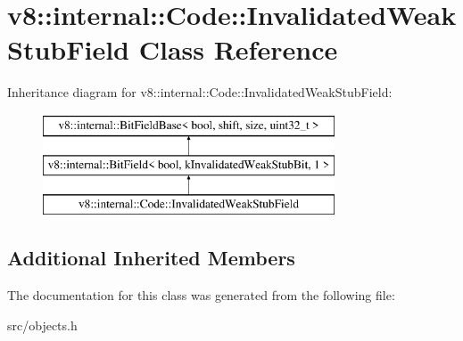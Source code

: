 \hypertarget{classv8_1_1internal_1_1_code_1_1_invalidated_weak_stub_field}{}\section{v8\+:\+:internal\+:\+:Code\+:\+:Invalidated\+Weak\+Stub\+Field Class Reference}
\label{classv8_1_1internal_1_1_code_1_1_invalidated_weak_stub_field}
Inheritance diagram for v8\+:\+:internal\+:\+:Code\+:\+:Invalidated\+Weak\+Stub\+Field\+:\begin{figure}[H]
\begin{center}
\leavevmode
\includegraphics[height=3.000000cm]{classv8_1_1internal_1_1_code_1_1_invalidated_weak_stub_field}
\end{center}
\end{figure}
\subsection*{Additional Inherited Members}


The documentation for this class was generated from the following file\+:\begin{DoxyCompactItemize}
\item 
src/objects.\+h\end{DoxyCompactItemize}
